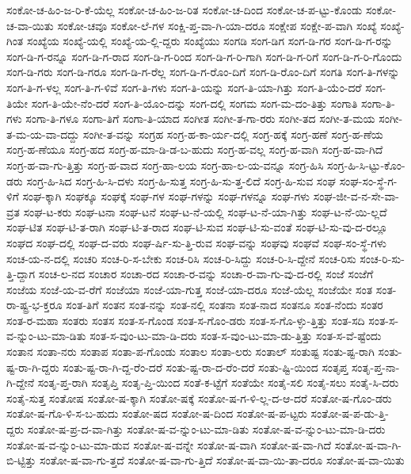 {ಸಂಕೋ-ಚ-ಹಿಂ-ಜ-ರಿ-ಕೆ-ಯೆಲ್ಲ
ಸಂಕೋ-ಚ-ಹಿಂ-ಜ-ರಿತ
ಸಂಕೋ-ಚ-ದಿಂದ
ಸಂಕೋ-ಚ-ಪ-ಟ್ಟು-ಕೊಂಡು
ಸಂಕೋ-ಚ-ವಾ-ಯಿತು
ಸಂಕೋ-ಚವೂ
ಸಂಕೋ-ಲೆ-ಗಳ
ಸಂಕ್ಷಿ-ಪ್ತ-ವಾ-ಗಿ-ಯಾ-ದರೂ
ಸಂಕ್ಷೇಪ
ಸಂಕ್ಷೇ-ಪ-ವಾಗಿ
ಸಂಖ್ಯೆ
ಸಂಖ್ಯೆ-ಗಿಂತ
ಸಂಖ್ಯೆಯ
ಸಂಖ್ಯೆ-ಯಲ್ಲಿ
ಸಂಖ್ಯೆ-ಯ-ಲ್ಲಿ-ದ್ದರು
ಸಂಖ್ಯೆಯು
ಸಂಗಡಿ
ಸಂಗ-ಡಿಗ
ಸಂಗ-ಡಿ-ಗರ
ಸಂಗ-ಡಿ-ಗ-ರನ್ನು
ಸಂಗ-ಡಿ-ಗ-ರನ್ನೂ
ಸಂಗ-ಡಿ-ಗ-ರಾದ
ಸಂಗ-ಡಿ-ಗ-ರಿಂದ
ಸಂಗ-ಡಿ-ಗ-ರಿ-ಗಾಗಿ
ಸಂಗ-ಡಿ-ಗ-ರಿಗೆ
ಸಂಗ-ಡಿ-ಗ-ರಿ-ಗೊಂದು
ಸಂಗ-ಡಿ-ಗರು
ಸಂಗ-ಡಿ-ಗರೂ
ಸಂಗ-ಡಿ-ಗ-ರೆಲ್ಲ
ಸಂಗ-ಡಿ-ಗ-ರೊಂ-ದಿಗೆ
ಸಂಗ-ಡಿ-ರೊಂ-ದಿಗೆ
ಸಂಗತಿ
ಸಂಗ-ತಿ-ಗಳನ್ನು
ಸಂಗ-ತಿ-ಗ-ಳಲ್ಲ
ಸಂಗ-ತಿ-ಗ-ಳಿವೆ
ಸಂಗ-ತಿ-ಗಳು
ಸಂಗ-ತಿ-ಯನ್ನು
ಸಂಗ-ತಿ-ಯಾ-ಗಿತ್ತು
ಸಂಗ-ತಿ-ಯೆಂ-ದರೆ
ಸಂಗ-ತಿಯೇ
ಸಂಗ-ತಿ-ಯೇ-ನೆಂ-ದರೆ
ಸಂಗ-ತಿ-ಯೊಂ-ದನ್ನು
ಸಂಗ-ದಲ್ಲಿ
ಸಂಗಮ
ಸಂಗ-ಮ-ದಂ-ತಿತ್ತು
ಸಂಗಾತಿ
ಸಂಗಾ-ತಿ-ಗಳು
ಸಂಗಾ-ತಿ-ಗಳೂ
ಸಂಗಾ-ತಿಗೆ
ಸಂಗಾ-ತಿ-ಯಾದ
ಸಂಗೀತ
ಸಂಗೀ-ತ-ಗಾ-ರರು
ಸಂಗೀ-ತದ
ಸಂಗೀ-ತ-ಮಯ
ಸಂಗೀ-ತ-ಮ-ಯ-ವಾ-ದದ್ದು
ಸಂಗೀ-ತ-ವನ್ನು
ಸಂಗ್ರಹ
ಸಂಗ್ರ-ಹ-ಕಾ-ರ್ಯ-ದಲ್ಲಿ
ಸಂಗ್ರ-ಹಕ್ಕೆ
ಸಂಗ್ರ-ಹಣೆ
ಸಂಗ್ರ-ಹ-ಣೆಯ
ಸಂಗ್ರ-ಹ-ಣೆಯೂ
ಸಂಗ್ರ-ಹದ
ಸಂಗ್ರ-ಹ-ಮಾ-ಡಿ-ಡ-ಬ-ಹುದು
ಸಂಗ್ರ-ಹ-ವಲ್ಲ
ಸಂಗ್ರ-ಹ-ವಾಗಿ
ಸಂಗ್ರ-ಹ-ವಾ-ಗಿದೆ
ಸಂಗ್ರ-ಹ-ವಾ-ಗು-ತ್ತಿತ್ತು
ಸಂಗ್ರ-ಹ-ವಾದ
ಸಂಗ್ರ-ಹಾ-ಲಯ
ಸಂಗ್ರ-ಹಾ-ಲ-ಯ-ವನ್ನೂ
ಸಂಗ್ರ-ಹಿಸಿ
ಸಂಗ್ರ-ಹಿ-ಸಿ-ಟ್ಟು-ಕೊಂ-ಡರು
ಸಂಗ್ರ-ಹಿ-ಸಿದ
ಸಂಗ್ರ-ಹಿ-ಸಿ-ದಳು
ಸಂಗ್ರ-ಹಿ-ಸುತ್ತ
ಸಂಗ್ರ-ಹಿ-ಸು-ತ್ತ-ಲಿದೆ
ಸಂಗ್ರ-ಹಿ-ಸುವ
ಸಂಘ
ಸಂಘ-ಸಂ-ಸ್ಥೆ-ಗ-ಳಿಗೆ
ಸಂಘ-ಕ್ಕಾಗಿ
ಸಂಘಕ್ಕೂ
ಸಂಘಕ್ಕೆ
ಸಂಘ-ಗಳ
ಸಂಘ-ಗಳನ್ನು
ಸಂಘ-ಗಳನ್ನೂ
ಸಂಘ-ಗಳು
ಸಂಘ-ಜೀ-ವ-ನ-ಸೇ-ವಾ-ವ್ರತ
ಸಂಘ-ಟ-ಕರು
ಸಂಘ-ಟನಾ
ಸಂಘ-ಟನೆ
ಸಂಘ-ಟ-ನೆ-ಯಲ್ಲಿ
ಸಂಘ-ಟ-ನೆ-ಯಾ-ಗಿತ್ತು
ಸಂಘ-ಟ-ನೆ-ಯಿ-ಲ್ಲದೆ
ಸಂಘ-ಟಿತ
ಸಂಘ-ಟಿ-ತ-ರಾಗಿ
ಸಂಘ-ಟಿ-ತ-ರಾದ
ಸಂಘ-ಟಿ-ಸುವ
ಸಂಘ-ಟಿ-ಸು-ವಂತೆ
ಸಂಘ-ಟಿ-ಸು-ವು-ದ-ರಲ್ಲೂ
ಸಂಘದ
ಸಂಘ-ದಲ್ಲಿ
ಸಂಘ-ದ-ವರು
ಸಂಘ-ರ್ಷಿ-ಸು-ತ್ತಿ-ರುವ
ಸಂಘ-ವನ್ನು
ಸಂಘವು
ಸಂಘವೆ
ಸಂಘ-ಸಂ-ಸ್ಥೆ-ಗಳು
ಸಂಚ-ಯ-ನ-ದಲ್ಲಿ
ಸಂಚರಿ
ಸಂಚ-ರಿ-ಸ-ಬೇಕು
ಸಂಚ-ರಿಸಿ
ಸಂಚ-ರಿ-ಸಿದ್ದು
ಸಂಚ-ರಿ-ಸಿ-ದ್ದೇನೆ
ಸಂಚ-ರಿಸು
ಸಂಚ-ರಿ-ಸು-ತ್ತಿ-ದ್ದಾಗ
ಸಂಚ-ಲ-ನದ
ಸಂಚಾರ
ಸಂಚಾ-ರದ
ಸಂಚಾ-ರ-ವನ್ನು
ಸಂಚಾ-ರ-ವಾ-ಗು-ವು-ದ-ರಲ್ಲಿ
ಸಂಜೆ
ಸಂಜೆಗೆ
ಸಂಜೆಯ
ಸಂಜೆ-ಯ-ವ-ರೆಗೆ
ಸಂಜೆಯಾ
ಸಂಜೆ-ಯಾ-ಗುತ್ತ
ಸಂಜೆ-ಯಾ-ದರೂ
ಸಂಜೆ-ಯೆಲ್ಲ
ಸಂಜೆಯೇ
ಸಂತ
ಸಂತ-ರಾ-ಷ್ಟ್ರ-ಭ-ಕ್ತರೂ
ಸಂತ-ತಿಗೆ
ಸಂತನ
ಸಂತ-ನನ್ನು
ಸಂತ-ನಲ್ಲಿ
ಸಂತನಾ
ಸಂತ-ನಾದ
ಸಂತನೂ
ಸಂತ-ನೆಂದು
ಸಂತರ
ಸಂತ-ರ-ಮಹಾ
ಸಂತರು
ಸಂತಸ
ಸಂತ-ಸ-ಗೊಂಡ
ಸಂತ-ಸ-ಗೊಂ-ಡರು
ಸಂತ-ಸ-ಗೊ-ಳ್ಳು-ತ್ತಿತ್ತು
ಸಂತ-ಸದಿ
ಸಂತ-ಸ-ವ-ನ್ನುಂ-ಟು-ಮಾ-ಡಿತು
ಸಂತ-ಸ-ವುಂ-ಟು-ಮಾ-ಡಿ-ದರು
ಸಂತ-ಸ-ವುಂ-ಟು-ಮಾ-ಡು-ತ್ತಿತ್ತು
ಸಂತ-ಸ-ವೆ-ಷ್ಟೆಂದು
ಸಂತಾನ
ಸಂತಾ-ನರು
ಸಂತಾಪ
ಸಂತಾ-ಪ-ಗೊಂಡು
ಸಂತಾಲ
ಸಂತಾ-ಲರು
ಸಂತಾಲ್
ಸಂತುಷ್ಟ
ಸಂತು-ಷ್ಟ-ರಾಗಿ
ಸಂತು-ಷ್ಟ-ರಾ-ಗಿ-ದ್ದರು
ಸಂತು-ಷ್ಟ-ರಾ-ಗಿ-ದ್ದ-ರೆಂ-ದರೆ
ಸಂತು-ಷ್ಟ-ರಾ-ದ-ರೆಂ-ದರೆ
ಸಂತು-ಷ್ಟಿ-ಯಿಂದ
ಸಂತೃಪ್ತ
ಸಂತೃ-ಪ್ತ-ನಾ-ಗಿ-ದ್ದೇನೆ
ಸಂತೃ-ಪ್ತ-ರಾಗಿ
ಸಂತೃಪ್ತಿ
ಸಂತೃ-ಪ್ತಿ-ಯಿಂದ
ಸಂತೆ-ಕ-ಟ್ಟೆಗೆ
ಸಂತೆಯೇ
ಸಂತೈ-ಸಲಿ
ಸಂತೈ-ಸಲು
ಸಂತೈ-ಸಿ-ದರು
ಸಂತೈ-ಸುತ್ತ
ಸಂತೋಷ
ಸಂತೋ-ಷ-ಕ್ಕಾಗಿ
ಸಂತೋ-ಷಕ್ಕೆ
ಸಂತೋ-ಷ-ಗ-ಳಿ-ಲ್ಲ-ದ-ಆ-ದರೆ
ಸಂತೋ-ಷ-ಗೊಂ-ಡರು
ಸಂತೋ-ಷ-ಗೊ-ಳಿ-ಸ-ಬ-ಹುದು
ಸಂತೋ-ಷದ
ಸಂತೋ-ಷ-ದಿಂದ
ಸಂತೋ-ಷ-ಪ-ಟ್ಟರು
ಸಂತೋ-ಷ-ಪ-ಡು-ತ್ತಿ-ದ್ದರು
ಸಂತೋ-ಷ-ಪ್ರ-ದ-ವಾ-ಗಿತ್ತು
ಸಂತೋ-ಷ-ವ-ನ್ನುಂ-ಟು-ಮಾ-ಡಿತು
ಸಂತೋ-ಷ-ವ-ನ್ನುಂ-ಟು-ಮಾ-ಡಿ-ದರು
ಸಂತೋ-ಷ-ವ-ನ್ನುಂ-ಟು-ಮಾ-ಡುವ
ಸಂತೋ-ಷ-ವನ್ನೇ
ಸಂತೋ-ಷ-ವಾಗಿ
ಸಂತೋ-ಷ-ವಾ-ಗಿದೆ
ಸಂತೋ-ಷ-ವಾ-ಗಿ-ಬಿ-ಟ್ಟಿತ್ತು
ಸಂತೋ-ಷ-ವಾ-ಗು-ತ್ತದೆ
ಸಂತೋ-ಷ-ವಾ-ಗು-ತ್ತಿದೆ
ಸಂತೋ-ಷ-ವಾ-ಯಿ-ತಾ-ದರೂ
ಸಂತೋ-ಷ-ವಾ-ಯಿತು
}
